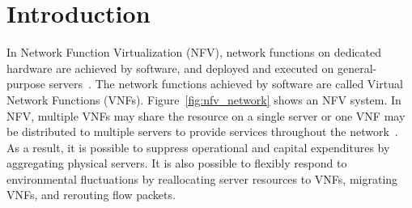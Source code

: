 \documentclass[technicalreport]{ieicej}
\begin{document}
	\section{Introduction}
	In Network Function Virtualization (NFV), network functions on dedicated hardware are achieved by software, and deployed and executed on general-purpose servers~\cite{nfv_whitepaper1}.
	The network functions achieved by software are called Virtual Network Functions (VNFs).
	Figure~\ref{fig:nfv_network} shows an NFV system.
	In NFV, multiple VNFs may share the resource on a single server or one VNF may be distributed to multiple servers to provide services throughout the network~\cite{julivergil2016tnsm,annaengelmann2018icc}.
	As a result, it is possible to suppress operational and capital expenditures by aggregating physical servers. It is also possible to flexibly respond to environmental fluctuations by reallocating server resources to VNFs, migrating VNFs, and rerouting flow packets.
\end{document}
